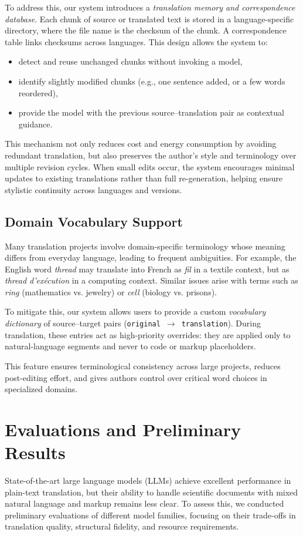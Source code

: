 \documentclass[runningheads]{llncs}
\begin{document}
To address this, our system introduces a \textit{translation memory and
correspondence database}. Each chunk of source or translated text is stored in
a language-specific directory, where the file name is the checksum of the
chunk. A correspondence table links checksums across languages. This design
allows the system to:
\begin{itemize}
    \item detect and reuse unchanged chunks without invoking a model,
    \item identify slightly modified chunks (e.g., one sentence added, or a few
    words reordered),
    \item provide the model with the previous source--translation pair as
    contextual guidance.
\end{itemize}

This mechanism not only reduces cost and energy consumption by avoiding
redundant translation, but also preserves the author’s style and terminology
over multiple revision cycles. When small edits occur, the system encourages
minimal updates to existing translations rather than full re-generation,
helping ensure stylistic continuity across languages and versions.

\subsection{Domain Vocabulary Support}
Many translation projects involve domain-specific terminology whose meaning
differs from everyday language, leading to frequent ambiguities. For example,
the English word \textit{thread} may translate into French as
\textit{fil} in a textile context, but as \textit{thread d’exécution} in a
computing context. Similar issues arise with terms such as
\textit{ring} (mathematics vs. jewelry) or \textit{cell} (biology vs. prisons).

To mitigate this, our system allows users to provide a custom
\textit{vocabulary dictionary} of source--target pairs
(\texttt{original}~$\rightarrow$~\texttt{translation}). During translation,
these entries act as high-priority overrides: they are applied only to
natural-language segments and never to code or markup placeholders. 

This feature ensures terminological consistency across large projects, reduces
post-editing effort, and gives authors control over critical word choices in
specialized domains.

\section{Evaluations and Preliminary Results}
State-of-the-art large language models (LLMs) achieve excellent performance in
plain-text translation, but their ability to handle scientific documents with
mixed natural language and markup remains less clear. To assess this, we
conducted preliminary evaluations of different model families, focusing on
their trade-offs in translation quality, structural fidelity, and resource
requirements.
\end{document}
